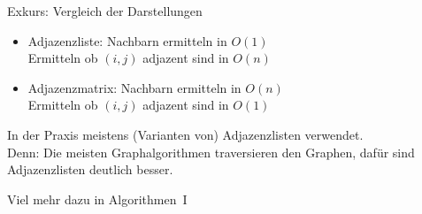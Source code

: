 \begin{frame}{Exkurs: Vergleich der Darstellungen}
	\begin{itemize}[<+->]
		\item Adjazenzliste: Nachbarn ermitteln in $O(1)$\\
		Ermitteln ob $(i,j)$ adjazent sind in $O(n)$
		\item Adjazenzmatrix: Nachbarn ermitteln in $O(n)$\\
		Ermitteln ob $(i,j)$ adjazent sind in $O(1)$
	\end{itemize}

	\pause
	In der Praxis meistens (Varianten von) Adjazenzlisten verwendet.\\
	Denn: Die meisten Graphalgorithmen traversieren den Graphen, dafür sind Adjazenzlisten deutlich besser.
	
	\bigskip
	Viel mehr dazu in Algorithmen~I
\end{frame}
